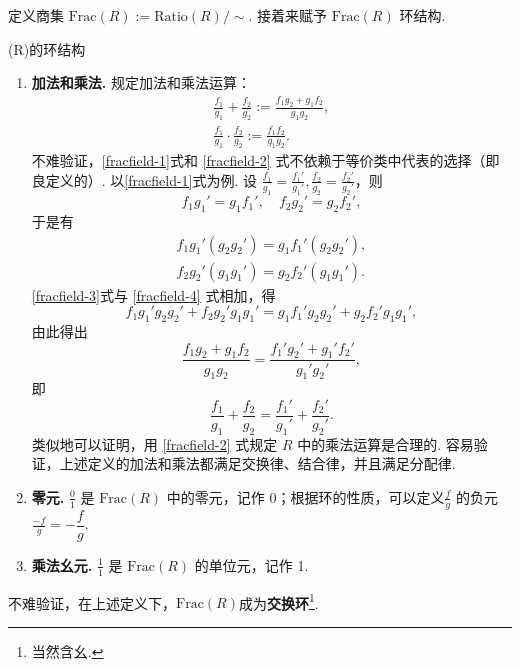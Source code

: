 \documentclass[12pt, a4paper]{ctexart}
\begin{document}
定义商集 $ \text{Frac}(R) := \text{Ratio}(R) / \sim $. 接着来赋予 $ \text{Frac}(R) $ 环结构. 
\begin{definition}{(R)的环结构}{}
	\begin{enumerate}[(1)]
		\item \textbf{加法和乘法.} 规定加法和乘法运算：\begin{gather}
			\frac{f_1}{g_1} + \frac{f_2}{g_2} := \frac{f_1 g_2 + g_1 f_2}{g_1 g_2}, \label{fracfield-1}\\\frac{f_1}{g_1} \cdot \frac{f_2}{g_2} := \frac{f_1 f_2}{g_1 g_2}. \label{fracfield-2}
		\end{gather}
		不难验证，\eqref{fracfield-1}式和 \eqref{fracfield-2} 式不依赖于等价类中代表的选择（即良定义的）. 以\eqref{fracfield-1}式为例. 设 $\frac{f_1}{g_1} = \frac{f_1'}{g_1'}, \frac{f_2}{g_2} = \frac{f_2'}{g_2'}$，则
		\[
		f_1 g_1' = g_1 f_1', \quad f_2 g_2' = g_2 f_2',
		\]
		于是有\begin{gather}
			f_1 g_1' (g_2 g_2') = g_1 f_1' (g_2 g_2'),\label{fracfield-3}\\f_2 g_2' (g_1 g_1') = g_2 f_2' (g_1 g_1').\label{fracfield-4}
		\end{gather}
		\eqref{fracfield-3}式与 \eqref{fracfield-4} 式相加，得
		\[
		f_1 g_1' g_2 g_2' + f_2 g_2' g_1 g_1' = g_1 f_1' g_2 g_2' + g_2 f_2' g_1 g_1',
		\]
		由此得出
		\[
		\frac{f_1 g_2 + g_1 f_2}{g_1 g_2} = \frac{f_1' g_2' + g_1' f_2'}{g_1' g_2'},
		\]
		即\begin{equation}
			\frac{f_1}{g_1} + \frac{f_2}{g_2} = \frac{f_1'}{g_1'} + \frac{f_2'}{g_2'}.
		\end{equation}
		类似地可以证明，用 \eqref{fracfield-2} 式规定 $ R $ 中的乘法运算是合理的. 容易验证，上述定义的加法和乘法都满足交换律、结合律，并且满足分配律. 
		\item \textbf{零元.} $ \frac{0}{1} $ 是 $ \text{Frac}(R) $ 中的零元，记作 $ 0 $；根据环的性质，可以定义$ \frac{f}{g} $ 的负元 $ \frac{-f}{g}=-\dfrac fg $. 
		\item \textbf{乘法幺元.} $ \frac{1}{1} $ 是 $ \text{Frac}(R) $ 的单位元，记作 1. 
	\end{enumerate}
\end{definition}
不难验证，在上述定义下，$\text{Frac}(R)$成为\textbf{交换环}\footnote{当然含幺.}. 
\end{document}
